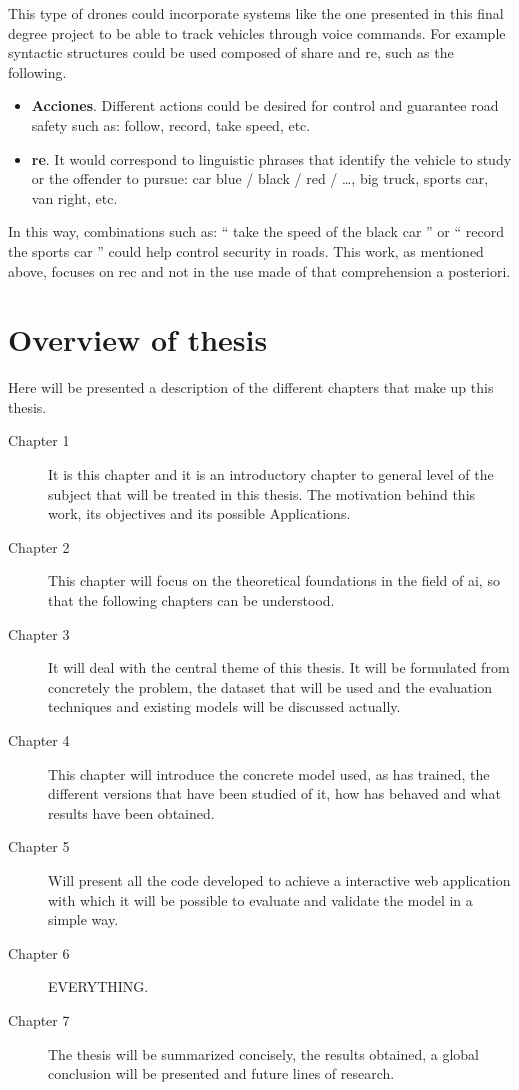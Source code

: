 This type of drones could incorporate systems like the one presented in this
final degree project to be able to track vehicles through
voice commands. For example syntactic structures could be used
composed of share and \gls{re}, such as the following.

\begin{itemize}
  \item \textbf{Acciones}. Different actions could be desired for
  control and guarantee road safety such as: follow, record, take
  speed, etc.
  \item \textbf{\gls*{re}}. It would correspond to linguistic phrases that
  identify the vehicle to study or the offender to pursue: car
  blue / black / red / \ldots, big truck, sports car, van
  right, etc.
\end{itemize}

In this way, combinations such as: `` take the speed of the black car '' or
`` record the sports car '' could help control security in
roads. This work, as mentioned above, focuses on
\gls{rec} and not in the use made of that comprehension a posteriori.


\section{Overview of thesis}

Here will be presented a description of the different chapters that make up
this thesis.

\begin{description}
  \item [Chapter 1] It is this chapter and it is an introductory chapter to
  general level of the subject that will be treated in this thesis. The
  motivation behind this work, its objectives and its possible
  Applications. 
  \item [Chapter 2] This chapter will focus on the theoretical foundations
  in the field of \gls{ai}, so that the following chapters
  can be understood. 
  \item [Chapter 3] It will deal with the central theme of this thesis. It will be formulated from
  concretely the problem, the dataset that will be used and the
  evaluation techniques and existing models will be discussed
  actually. 
  \item [Chapter 4] This chapter will introduce the concrete model used, as
  has trained, the different versions that have been studied of it, how
  has behaved and what results have been obtained. 
  \item [Chapter 5] Will present all the code developed to achieve a
  interactive web application with which it will be possible to evaluate and validate the
  model in a simple way. 
  \item [Chapter 6] EVERYTHING. 
  \item [Chapter 7] The thesis will be summarized concisely, the
  results obtained, a global conclusion will be presented and
  future lines of research. 
\end{description}

